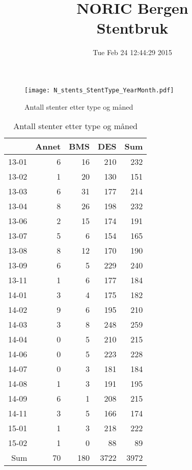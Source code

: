 \documentclass[presentation,xcolor=pdftex,dvipsnames,table]{beamer}
\title{NORIC Bergen \\Stentbruk}\date{ Tue Feb 24 12:44:29 2015 }
\begin{document}
\maketitle



\begin{frame}
\begin{figure}
  \centering
  \caption{Antall stenter etter type og måned}
  

\texttt{[image: N\_stents\_StentType\_YearMonth.pdf]}
\end{figure}
\end{frame}



\begin{frame}
\begin{tiny}
\begin{table}[ht]
\centering
\begin{tabular}{rrrrr}
  \toprule
 & Annet & BMS & DES & Sum \\ 
  \midrule
13-01 & 6 & 16 & 210 & 232 \\ 
  13-02 & 1 & 20 & 130 & 151 \\ 
  13-03 & 6 & 31 & 177 & 214 \\ 
  13-04 & 8 & 26 & 198 & 232 \\ 
  13-06 & 2 & 15 & 174 & 191 \\ 
  13-07 & 5 & 6 & 154 & 165 \\ 
  13-08 & 8 & 12 & 170 & 190 \\ 
  13-09 & 6 & 5 & 229 & 240 \\ 
  13-11 & 1 & 6 & 177 & 184 \\ 
  14-01 & 3 & 4 & 175 & 182 \\ 
  14-02 & 9 & 6 & 195 & 210 \\ 
  14-03 & 3 & 8 & 248 & 259 \\ 
  14-04 & 0 & 5 & 210 & 215 \\ 
  14-06 & 0 & 5 & 223 & 228 \\ 
  14-07 & 0 & 3 & 181 & 184 \\ 
  14-08 & 1 & 3 & 191 & 195 \\ 
  14-09 & 6 & 1 & 208 & 215 \\ 
  14-11 & 3 & 5 & 166 & 174 \\ 
  15-01 & 1 & 3 & 218 & 222 \\ 
  15-02 & 1 & 0 & 88 & 89 \\ 
  Sum & 70 & 180 & 3722 & 3972 \\ 
   \bottomrule
\end{tabular}
\caption{Antall stenter etter type og måned} 
\end{table}\end{tiny}
\end{frame}
\end{document}
